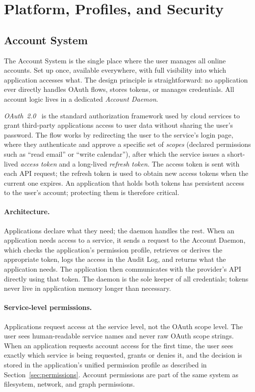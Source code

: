 \section{Platform, Profiles, and Security}
\label{sec:platform}

\subsection{Account System}
\label{sec:accounts}

The Account System is the single place where the user manages all online
accounts. Set up once, available everywhere, with full visibility into which
application accesses what. The design principle is straightforward: no
application ever directly handles OAuth flows, stores tokens, or manages
credentials. All account logic lives in a dedicated \emph{Account Daemon}.

\emph{OAuth~2.0}~\cite{rfc6749} is the standard authorization framework used
by cloud services to grant third-party applications access to user data without
sharing the user's password. The flow works by redirecting the user to the
service's login page, where they authenticate and approve a specific set of
\emph{scopes} (declared permissions such as ``read email'' or ``write
calendar''), after which the service issues a short-lived \emph{access token}
and a long-lived \emph{refresh token}. The access token is sent with each API
request; the refresh token is used to obtain new access tokens when the current
one expires. An application that holds both tokens has persistent access to the
user's account; protecting them is therefore critical.

\paragraph{Architecture.}
Applications declare what they need; the daemon handles the rest. When an
application needs access to a service, it sends a request to the Account
Daemon, which checks the application's permission profile, retrieves or
derives the appropriate token, logs the access in the Audit Log, and returns
what the application needs. The application then communicates with the
provider's API directly using that token. The daemon is the sole keeper of
all credentials; tokens never live in application memory longer than
necessary.

\paragraph{Service-level permissions.}
Applications request access at the service level, not the OAuth scope level.
The user sees human-readable service names and never raw OAuth scope strings.
When an application requests account access for the first time, the user sees
exactly which service is being requested, grants or denies it, and the
decision is stored in the application's unified permission profile as described
in Section~\ref{sec:permissions}. Account permissions are part of the same
system as filesystem, network, and graph permissions.

